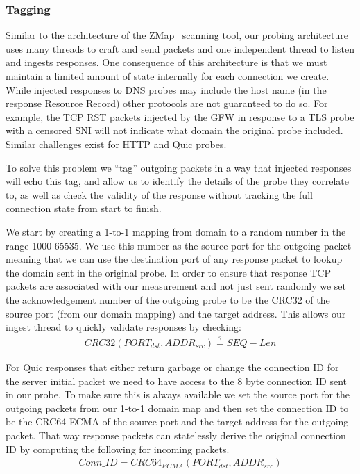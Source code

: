 \subsubsection{Tagging}

Similar to the architecture of the ZMap~\cite{zmap} scanning tool, our probing architecture
uses many threads to craft and send packets and one independent thread to listen
and ingests responses. One consequence of this architecture is that we must
maintain a limited amount of state internally for each connection we create.
While injected responses to DNS probes may include the host name (in the
response Resource Record) other protocols are not guaranteed to do so. For
example, the TCP RST packets injected by the GFW in response to a TLS probe with
a censored SNI will not indicate what domain the original probe included.
Similar challenges exist for HTTP and Quic probes.

To solve this problem we ``tag'' outgoing packets in a way that injected
responses will echo this tag, and allow us to identify the details of the probe
they correlate to, as well as check the
validity of the response without tracking the full connection state from start
to finish.

We start by creating a 1-to-1 mapping from domain to a random number in the
range 1000-65535. We use this number as the source port for the outgoing packet
meaning that we can use the destination port of any response packet to lookup
the domain sent in the original probe. In order to ensure that response TCP
packets are associated with our measurement and not just sent randomly we set
the acknowledgement number of the outgoing probe to be the CRC32 of the source
port (from our domain mapping) and the target address. This allows our ingest
thread to quickly validate responses by checking:
\begin{gather*}
CRC32(PORT_{dst},ADDR_{src}) \stackrel{?}{=} SEQ - Len
\end{gather*}

For Quic responses that either return garbage or change the connection ID for
the server initial packet we need to have access to the 8 byte connection ID
sent in our probe. To make sure this is always available we set the source port
for the outgoing packets from our 1-to-1 domain map and then set the connection
ID to be the CRC64-ECMA of the source port and the target address for the
outgoing packet. That way response packets can statelessly derive the original
connection ID by computing the following for incoming packets.
\begin{gather*}
Conn\_ID = CRC64_{ECMA}(PORT_{dst},ADDR_{src})
\end{gather*}


